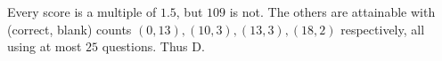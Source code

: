 Every score is a multiple of $1.5$, but $109$ is not. The others are attainable with (correct, blank) counts $(0,13),(10,3),(13,3),(18,2)$ respectively, all using at most $25$ questions. Thus $\boxed{\text{D}}$.
